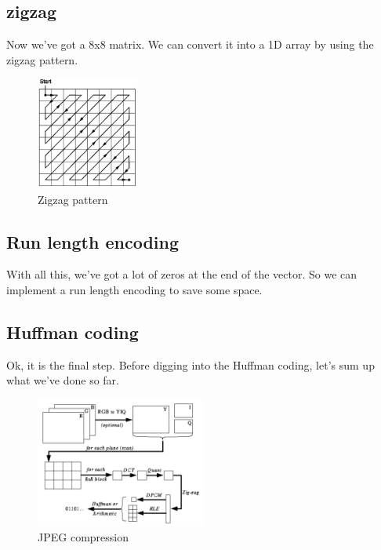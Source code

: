 \subsection{zigzag}

Now we've got a 8x8 matrix.
We can convert it into a 1D array by using the zigzag pattern.

\begin{figure}[H]
    \centering
    \includegraphics[width=0.3\textwidth]{src/assets/zigzag.jpg}
    \caption{Zigzag pattern}
    \label{fig:zigzag}
\end{figure}


\subsection{Run length encoding}
With all this, we've got a lot of zeros at the end of the vector.
So we can implement a run length encoding to save some space.


\subsection{Huffman coding}

Ok, it is the final step.
Before digging into the Huffman coding, let's sum up what we've done so far.


\begin{figure}[H]
    \centering
    \includegraphics[width=0.5\textwidth]{src/assets/encoding.png}
    \caption{JPEG compression}
    \label{fig:encoding}
\end{figure}

